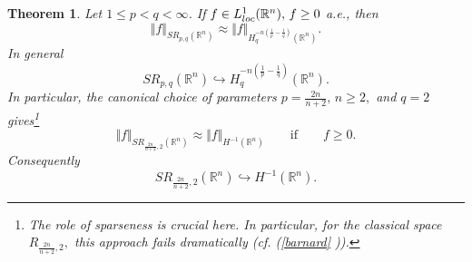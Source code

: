 \documentclass[11pt, a4paper,leqno]{amsart}
\newtheorem{theorem}{Theorem}
\theoremstyle{plain}
\numberwithin{equation}{section}
\theoremstyle{definition}
\theoremstyle{remark}
\def\R{\mathbb{R}}
\begin{document}
\begin{theorem}\label{CorSparSob}
Let $1\leq p<q<\infty$. If  $f \in L^{1}_{\emph{loc}}
(\mathbb{R}^{n}), \, f \geq0$ a.e.,  then
\[
\Vert f\Vert_{SR_{p,q}(\mathbb{R}^{n})}\approx\Vert f\Vert_{H_{q}^{-n(\frac
{1}{p}-\frac{1}{q})}(\mathbb{R}^{n})}.
\]
In general 
\[
SR_{p, q}(\R^{n}) \hookrightarrow H_{q}^{-n(\frac{1}{p}-\frac{1}{q}%
)}(\mathbb{R}^{n}).
\]
In particular, the canonical choice of parameters  $p=\frac{2n}{n+2}, \, n \geq 2,$ and $q=2$ gives\footnote{The role of
sparseness is crucial here. In particular, for the classical space
$R_{\frac{2n}{n+2},2},$ this approach fails dramatically (cf. (\ref{barnard}%
)).} 
\begin{equation}\label{SobIde}
	\Vert f\Vert_{SR_{\frac{2n}{n+2},2}(\mathbb{R}^{n})}\approx\Vert f\Vert_{H^{-1}(\mathbb{R}^{n})} \qquad \text{if} \qquad f \geq 0.
\end{equation}
Consequently
\begin{equation}\label{SobIde2}
	SR_{\frac{2n}{n+2},2}(\mathbb{R}^{n}) \hookrightarrow H^{-1}(\R^n). 
\end{equation}
\end{theorem}





%
\end{document}
